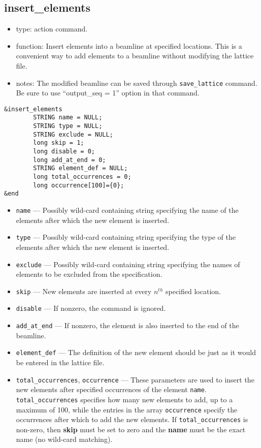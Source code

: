 \documentclass[11pt]{article}
\begin{document}
\subsection{insert\_elements \label{subsec:insertelements}}

\begin{itemize}
\item type: action command.
\item function: Insert elements into a beamline at specified locations. This is a convenient way to
 add elements to a beamline without modifying the lattice file.
\item notes: 
	The modified beamline can be saved through \verb|save_lattice|
   command. Be sure to use ``output\_seq = 1'' option in that command.  
\end{itemize}

\begin{verbatim}
&insert_elements
        STRING name = NULL;
        STRING type = NULL;
        STRING exclude = NULL;
        long skip = 1;
        long disable = 0;
        long add_at_end = 0;
        STRING element_def = NULL;
        long total_occurrences = 0;
        long occurrence[100]={0};
&end
\end{verbatim}

\begin{itemize}
\item \verb|name| --- Possibly wild-card containing string specifying the
   name of the elements after which the new element is inserted.
\item \verb|type| --- Possibly wild-card containing string specifying the
   type of the elements after which the new element is inserted.
\item \verb|exclude| --- Possibly wild-card containing string specifying 
   the names of elements to be excluded from the specification.
\item \verb|skip| --- New elements are inserted at every $n^{th}$ specified location.
\item \verb|disable| --- If nonzero, the command is ignored.
\item \verb|add_at_end| --- If nonzero, the element is also inserted to the end of the beamline.
\item \verb|element_def| --- The definition of the new element should be just as it would be entered in 
the lattice file.
\item \verb|total_occurrences|, \verb|occurrence| --- 
These parameters are used to insert the new elements after specified occurrences of 
the element \verb|name|.  \verb|total_occurrences| specifies how many new elements to add,
up to a maximum of 100, while the entries in the array \verb|occurrence| specify the occurrences
after which to add the new elements. If \verb|total_occurrences| is non-zero, then {\bf skip} must
be set to zero  and the {\bf name} must be the exact name (no wild-card matching). 
\end{itemize}
\end{document}
